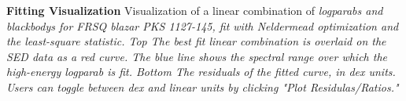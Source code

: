 \textbf{\label{fig:fitting_window} Fitting Visualization} Visualization of a linear combination of \it{logparab}s and \it{blackbody}s for FRSQ blazar PKS 1127-145, fit with Neldermead optimization and the least-square statistic. \it{Top} The best fit linear combination is overlaid on the SED data as a red curve. The blue line shows the spectral range over which the high-energy \it{logparab} is fit. \it{Bottom} The residuals of the fitted curve, in dex units. Users can toggle between dex and linear units by clicking "Plot Residulas/Ratios."